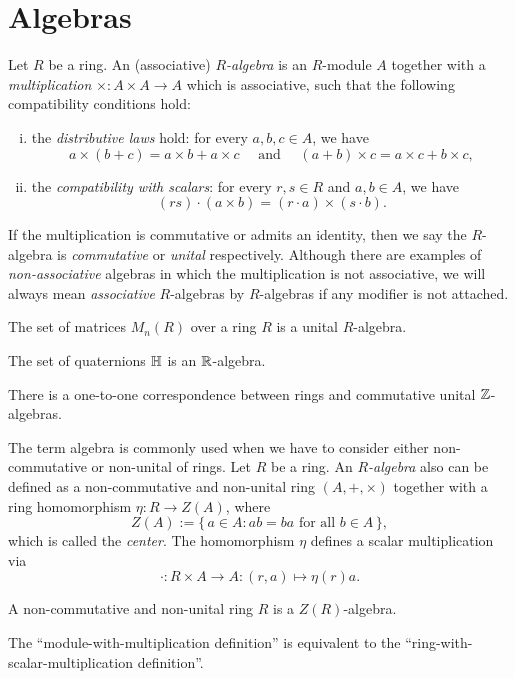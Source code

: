 \documentclass{../../large}
\begin{document}
\section{Algebras}
\begin{prb}
Let $R$ be a ring.
An (associative) \emph{$R$-algebra} is an $R$-module $A$ together with a \emph{multiplication} $\times:A\times A\to A$ which is associative, such that the following compatibility conditions hold:
\begin{enumerate}[(i)]
\item the \emph{distributive laws} hold: for every $a,b,c\in A$, we have
\[a\times(b+c)=a\times b+a\times c\quad\text{ and }\quad(a+b)\times c=a\times c+b\times c,\]
\item the \emph{compatibility with scalars}: for every $r,s\in R$ and $a,b\in A$, we have
\[(rs)\cdot(a\times b)=(r\cdot a)\times(s\cdot b).\]
\end{enumerate}
If the multiplication is commutative or admits an identity, then we say the $R$-algebra is \emph{commutative} or \emph{unital} respectively.
Although there are examples of \emph{non-associative} algebras in which the multiplication is not associative, we will always mean \emph{associative} $R$-algebras by $R$-algebras if any modifier is not attached.
\begin{parts}
\item The set of matrices $M_n(R)$ over a ring $R$ is a unital $R$-algebra.
\item The set of quaternions $\mathbb{H}$ is an $\mathbb{R}$-algebra.
\item There is a one-to-one correspondence between rings and commutative unital $\mathbb{Z}$-algebras.
\end{parts}
\end{prb}


\begin{prb}
The term algebra is commonly used when we have to consider either non-commutative or non-unital of rings.
Let $R$ be a ring.
An \emph{$R$-algebra} also can be defined as a non-commutative and non-unital ring $(A,+,\times)$ together with a ring homomorphism $\eta:R\to Z(A)$, where
\[Z(A):=\{\,a\in A:ab=ba\text{ for all }b\in A\,\},\]
which is called the \emph{center}.
The homomorphism $\eta$ defines a scalar multiplication via
\[\cdot:R\times A\to A:(r,a)\mapsto\eta(r)a.\]
\begin{parts}
\item A non-commutative and non-unital ring $R$ is a $Z(R)$-algebra.
\item The ``module-with-multiplication definition'' is equivalent to the ``ring-with-scalar-multiplication definition''.
\end{parts}
\end{prb}
\end{document}
